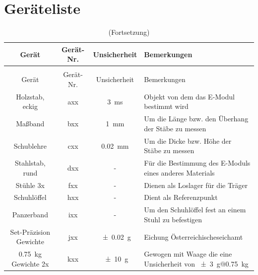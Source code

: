 \documentclass[11pt,ngerman]{scrartcl}
\begin{document}
\section{Geräteliste}
\label{sec:geraeteliste}
\begin{longtable}{c|c|S|p{15em}}
	\caption[Geräteliste]{Verwendete Geräte \label{tab:geraeteliste}}                                                                     \\  %
	\toprule
	Gerät                      & Gerät-Nr. & { Unsicherheit }   & Bemerkungen                                                             \\
	\midrule
	\endfirsthead
	\caption[]{(Fortsetzung)}                                                                                                             \\
	\toprule
	Gerät                      & Gerät-Nr. & { Unsicherheit }   & Bemerkungen                                                             \\
	\midrule
	\endhead
	\endfoot
	\endlastfoot
	Holzstab, eckig            & axx       & \SI{3}{\ms}        & Objekt von dem das E-Modul bestimmt wird                                \\ \hline
	Maßband                    & bxx       & \SI{1}{\mm}        & Um die Länge bzw. den Überhang der Stäbe zu messen                      \\ \hline
	Schublehre                 & cxx       & \SI{0.02}{\mm}     & Um die Dicke bzw. Höhe der Stäbe zu messen                              \\ \hline
	Stahlstab, rund            & dxx       & { - }              & Für die Bestimmung des E-Moduls eines anderes Materials                 \\ \hline
	Stühle 3x                  & fxx       & { - }              & Dienen als Loslager für die Träger                                      \\ \hline
	Schuhlöffel                & hxx       & { - }              & Dient als Referenzpunkt                                                 \\ \hline
	Panzerband                 & ixx       & { - }              & Um den Schuhlöffel fest an einem Stuhl zu befestigen                    \\ \hline
	Set-Präzision Gewichte     & jxx       & \SI{+-0.02}{\gram} & Eichung Österreichischeseichamt                                         \\ \hline
	\SI{0.75}{\kg} Gewichte 2x & kxx       & \SI{+-10}{\gram}   & Gewogen mit Waage die eine Unsicherheit von \SI{+-3}{\g}@\SI{0.75}{\kg} \\ \hline

	\hline
\end{longtable}
\end{document}
